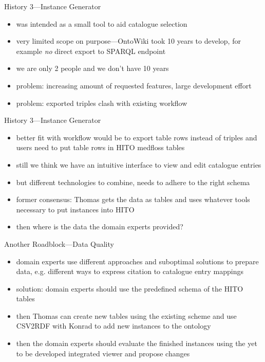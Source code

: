 \documentclass[aspectratio=1610]{beamer}
\begin{document}
\begin{frame}{History 3---Instance Generator}
\begin{itemize}
  \item was intended as a small tool to aid catalogue selection
  \item very limited scope on purpose---OntoWiki took 10 years to develop, for example \emph{no} direct export to SPARQL endpoint
  \item we are only 2 people and we don't have 10 years
  \item problem: increasing amount of requested features, large development effort
  \item problem: exported triples clash with existing workflow
\end{itemize}
\end{frame}

\begin{frame}{History 3---Instance Generator}
\begin{itemize}
  \item better fit with workflow would be to export table rows instead of triples and users need to put table rows in HITO medfloss tables
  \item still we think we have an intuitive interface to view and edit catalogue entries
  \item but different technologies to combine, needs to adhere to the right schema
  \item former consensus: Thomas gets the data as tables and uses whatever tools necessary to put instances into HITO
  \item then where is the data the domain experts provided?
\end{itemize}
\end{frame}

\begin{frame}{Another Roadblock---Data Quality}
\begin{itemize}
  \item domain experts use different approaches and suboptimal solutions to prepare data, e.g. different ways to express citation to catalogue entry mappings
  \item solution: domain experts should use the predefined schema of the HITO tables
  \item then Thomas can create new tables using the existing scheme and use CSV2RDF with Konrad to add new instances to the ontology
  \item then the domain experts should evaluate the finished instances using the yet to be developed integrated viewer and propose changes
\end{itemize}
\end{frame}
\end{document}
